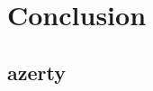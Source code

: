 \documentclass[../main.tex]{subfiles}
\begin{document}
\chapter{Conclusion}

\section{azerty}

\lipsum[3-4]
\end{document}
